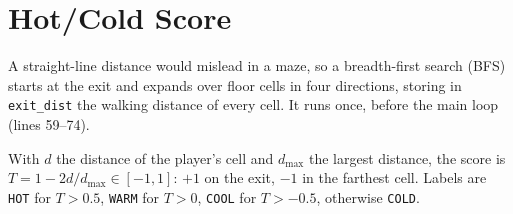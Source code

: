 \section{Hot/Cold Score}

A straight-line distance would mislead in a maze, so a breadth-first search (BFS) starts at the exit and expands over floor cells in four directions, storing in \texttt{exit\_dist} the walking distance of every cell. It runs once, before the main loop (lines 59--74).


With $d$ the distance of the player's cell and $d_{\max}$ the largest distance, the score is $T=1-2d/d_{\max}\in[-1,1]$: $+1$ on the exit, $-1$ in the farthest cell. Labels are \texttt{HOT} for $T>0.5$, \texttt{WARM} for $T>0$, \texttt{COOL} for $T>-0.5$, otherwise \texttt{COLD}.
